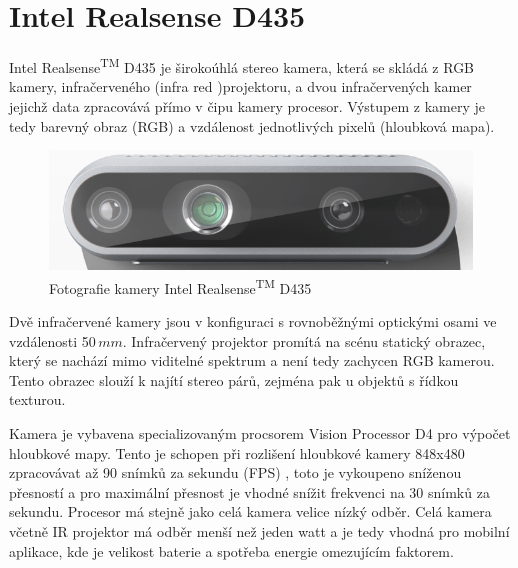 \documentclass[twoside]{ctuthesis}
\begin{document}
\section{Intel Realsense D435}
Intel\textregistered{} Realsense\textsuperscript{TM} D435 je širokoúhlá stereo kamera, která se skládá z RGB kamery, infračerveného (infra red )projektoru, a dvou infračervených kamer jejichž data zpracovává přímo v čipu kamery procesor. Výstupem z kamery je tedy barevný obraz (RGB) a vzdálenost jednotlivých pixelů (hloubková mapa). 

\begin{figure}
    \centering
    \includegraphics[width = 0.8\linewidth]{pictures/realsense_kamera.png}
    \caption{Fotografie kamery Intel\textregistered{} Realsense\textsuperscript{TM} D435 \cite{Realsense_obrazek}}
    \label{Fig:realsense_pic}
\end{figure}

    Dvě infračervené kamery jsou v konfiguraci s rovnoběžnými optickými osami ve vzdálenosti 50$\,mm$. Infračervený projektor promítá na scénu statický obrazec, který se nachází mimo viditelné spektrum a není tedy zachycen RGB kamerou. Tento obrazec slouží k najítí stereo párů, zejména pak u objektů s řídkou texturou.

    Kamera je vybavena specializovaným procsorem Vision Processor D4 pro výpočet hloubkové mapy. Tento je schopen při rozlišení hloubkové kamery 848x480 zpracovávat až 90 snímků za sekundu (FPS) \cite{RealSense_datasheet}, toto je vykoupeno sníženou přesností \cite{keselman2017intel} a pro maximální přesnost je vhodné snížit frekvenci na 30 snímků za sekundu.  Procesor má stejně jako celá kamera velice nízký odběr. Celá kamera včetně IR projektor má odběr menší než jeden watt a je tedy vhodná pro mobilní aplikace, kde je velikost baterie a spotřeba energie omezujícím faktorem.
\end{document}
